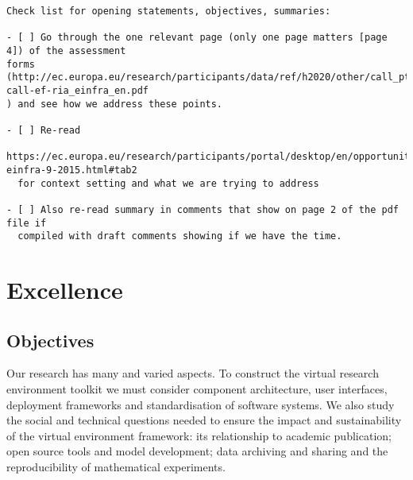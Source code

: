 \documentclass[noworkareas,deliverables,\classoptions]{euproposal}       %
\begin{document}
\begin{proposal}
\begin{draft}
\end{draft}
\begin{draft}

\begin{verbatim}
Check list for opening statements, objectives, summaries:

- [ ] Go through the one relevant page (only one page matters [page 4]) of the assessment
forms
(http://ec.europa.eu/research/participants/data/ref/h2020/other/call_ptef/ef/h2020-call-ef-ria_einfra_en.pdf
) and see how we address these points.

- [ ] Re-read
  https://ec.europa.eu/research/participants/portal/desktop/en/opportunities/h2020/topics/2144-einfra-9-2015.html#tab2
  for context setting and what we are trying to address

- [ ] Also re-read summary in comments that show on page 2 of the pdf file if
  compiled with draft comments showing if we have the time.
\end{verbatim}
\clearpage
\end{draft}




\section{Excellence}



\subsection{Objectives}
\label{sect:objectives}


Our research has many and varied aspects. To
construct the \TheProject virtual research environment toolkit we must
consider component architecture, user interfaces, deployment
frameworks and standardisation of software systems.  We also study
the social and technical questions needed to ensure the impact and sustainability of the
virtual environment framework: its relationship to academic publication; open source
tools and model development; data archiving and sharing and the reproducibility of
mathematical experiments.


\end{proposal}
\end{document}

